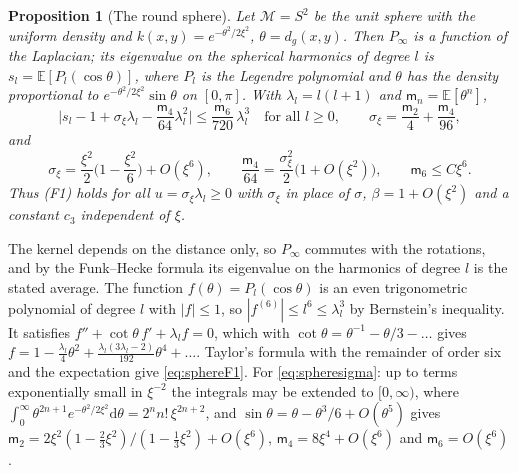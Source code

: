 \documentclass[11pt,a4paper]{article}
\makeatletter
\theoremstyle{stmt}
\newtheorem{proposition}[theorem]{Proposition}
\theoremstyle{defn}
\theoremstyle{rmk}
\renewenvironment{proof}[1][\proofname]{\par\pushQED{\qed}\normalfont\topsep6\p@\@plus6\p@\relax
  \trivlist\item[\hskip\labelsep{\sffamily\itshape\small #1.}]\ignorespaces}{\popQED\endtrivlist\@endpefalse}
\numberwithin{equation}{section}
\newcommand{\M}{\mathcal{M}}
\newcommand{\dd}{\mathrm{d}}
\makeatother
\begin{document}
{\begin{proposition}[The round sphere]\label{prop:sphere}
Let $\M=S^2$ be the unit sphere with the uniform density and $k(x,y)=e^{-\theta^2/2\xi^2}$, $\theta=d_g(x,y)$. Then $P_\infty$ is a function of the Laplacian; its eigenvalue on the spherical harmonics of degree $l$ is $s_l=\mathbb E[P_l(\cos\theta)]$, where $P_l$ is the Legendre polynomial and $\theta$ has the density proportional to $e^{-\theta^2/2\xi^2}\sin\theta$ on $[0,\pi]$. With $\lambda_l=l(l+1)$ and $\mathsf m_n=\mathbb E[\theta^n]$,
\begin{equation}\label{eq:sphereF1}
\Big|s_l-1+\sigma_\xi\lambda_l-\frac{\mathsf m_4}{64}\lambda_l^2\Big|\le\frac{\mathsf m_6}{720}\,\lambda_l^3\quad\text{for all }l\ge0,\qquad\sigma_\xi=\frac{\mathsf m_2}{4}+\frac{\mathsf m_4}{96},
\end{equation}
and
\begin{equation}\label{eq:spheresigma}
\sigma_\xi=\frac{\xi^2}{2}\Big(1-\frac{\xi^2}{6}\Big)+O(\xi^6),\qquad\frac{\mathsf m_4}{64}=\frac{\sigma_\xi^2}{2}\big(1+O(\xi^2)\big),\qquad\mathsf m_6\le C\xi^6 .
\end{equation}
Thus \textup{(F1)} holds for all $u=\sigma_\xi\lambda_l\ge0$ with $\sigma_\xi$ in place of $\sigma$, $\beta=1+O(\xi^2)$ and a constant $c_3$ independent of $\xi$.
\end{proposition}

\begin{proof}
The kernel depends on the distance only, so $P_\infty$ commutes with the rotations, and by the Funk--Hecke formula its eigenvalue on the harmonics of degree $l$ is the stated average. The function $f(\theta)=P_l(\cos\theta)$ is an even trigonometric polynomial of degree $l$ with $|f|\le1$, so $|f^{(6)}|\le l^6\le\lambda_l^3$ by Bernstein's inequality. It satisfies $f''+\cot\theta\,f'+\lambda_lf=0$, which with $\cot\theta=\theta^{-1}-\theta/3-\dots$ gives $f=1-\tfrac{\lambda_l}4\theta^2+\tfrac{\lambda_l(3\lambda_l-2)}{192}\theta^4+\dots$. Taylor's formula with the remainder of order six and the expectation give \eqref{eq:sphereF1}. For \eqref{eq:spheresigma}: up to terms exponentially small in $\xi^{-2}$ the integrals may be extended to $[0,\infty)$, where $\int_0^\infty\theta^{2n+1}e^{-\theta^2/2\xi^2}\dd\theta=2^nn!\,\xi^{2n+2}$, and $\sin\theta=\theta-\theta^3/6+O(\theta^5)$ gives $\mathsf m_2=2\xi^2(1-\tfrac23\xi^2)/(1-\tfrac13\xi^2)+O(\xi^6)$, $\mathsf m_4=8\xi^4+O(\xi^6)$ and $\mathsf m_6=O(\xi^6)$.
\end{proof}

}
\end{document}
